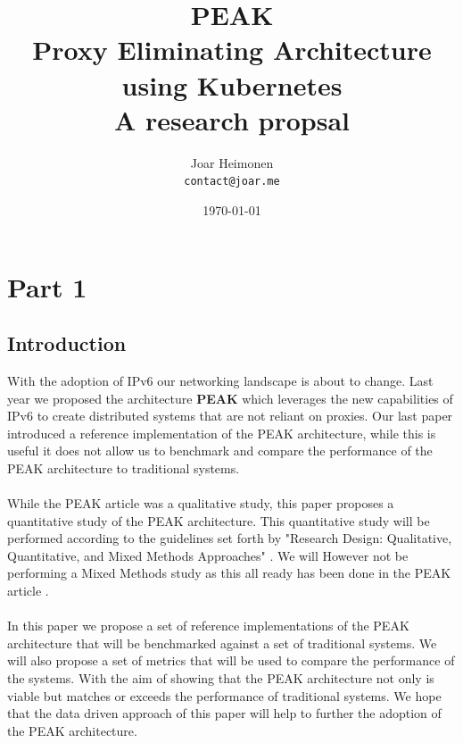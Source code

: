 \documentclass[12pt]{article}
\author{
    Joar Heimonen\\
    \texttt{contact@joar.me}
}
\title{
    \textbf{PEAK}\\[0.5em]
    \large \textbf{P}roxy \textbf{E}liminating \textbf{A}rchitecture using \textbf{K}ubernetes\\[0.3em]
    \large A research propsal
}
\date{\today}
\begin{document}
\maketitle

\pagebreak

\tableofcontents

\pagebreak


\section{Part 1}
\subsection{Introduction}
With the adoption of IPv6 \cite{hindenInternetProtocolVersion1998a} our networking landscape is about to change. Last year we proposed the architecture \textbf{PEAK} \cite{heimonenPreprintPEAKProxy2024} which leverages the new capabilities of IPv6
to create distributed systems that are not reliant on proxies.
Our last paper introduced a reference implementation of the PEAK architecture, while this is useful it does not allow us to benchmark and compare the performance of 
the PEAK architecture to traditional systems.
\\
\\
While the PEAK article \cite{heimonenPreprintPEAKProxy2024} was a qualitative study, this paper proposes a quantitative study of the PEAK architecture.
This quantitative study will be performed according to the guidelines set forth by "Research Design: Qualitative, Quantitative, and Mixed Methods Approaches" \cite{creswellResearchDesignQualitative}.
We will However not be performing a Mixed Methods study as this all ready has been done in the PEAK article \cite{heimonenPreprintPEAKProxy2024}.
\\
\\
In this paper we propose a set of reference implementations of the PEAK architecture that will be benchmarked against a set of traditional systems.
We will also propose a set of metrics that will be used to compare the performance of the systems.
With the aim of showing that the PEAK architecture not only is viable but matches or exceeds the performance of traditional systems.
We hope that the data driven approach of this paper will help to further the adoption of the PEAK architecture.
\end{document}
